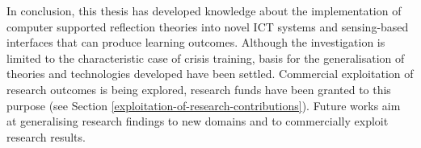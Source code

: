 In conclusion, this thesis has developed knowledge about the implementation of computer supported reflection theories into novel ICT systems and sensing-based interfaces that can produce learning outcomes. Although the investigation is limited to the characteristic case of crisis training, basis for the generalisation of theories and technologies developed have been settled. Commercial exploitation of research outcomes is being explored, research funds have been granted to this purpose (see Section \ref{exploitation-of-research-contributions}). Future works aim at generalising research findings to new domains and to commercially exploit research results. 
